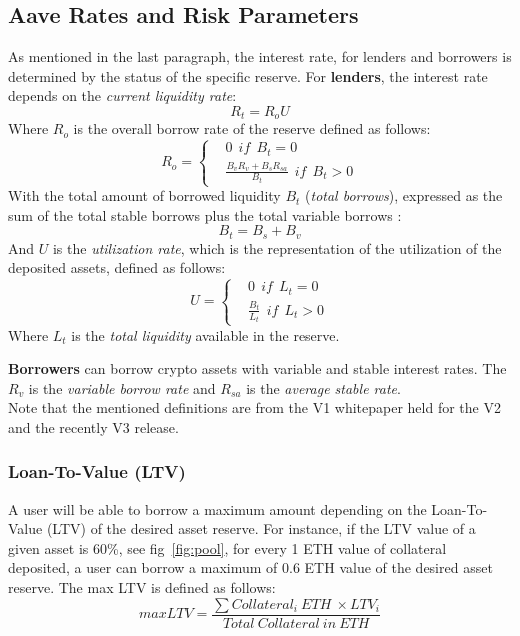\documentclass[11pt,a4paper]{report}
\begin{document}
\subsection{Aave Rates and Risk Parameters}\label{rates}
 As mentioned in the last paragraph, the interest rate, for lenders and borrowers is determined by the status of the specific reserve. For \textbf{lenders}, the interest rate depends on  the \textit{current liquidity rate}:
\[ R_{t} = R_{o}U \]
Where $ R_{o} $ is the overall borrow rate of the reserve defined as follows:
\begin{equation}
	R_{o} = 
	\left\{\begin{matrix}
		&  0~~if~~B_{t}=0\\ 
		& \frac{B_{v}R_{v}+ B_{s}R_{sa}}{B_{t}}~~if~~B_{t} > 0
	\end{matrix}\right.
\end{equation}
With the total amount of borrowed liquidity $B_{t} $ (\textit{total borrows}), expressed as the sum of the total stable borrows plus  the total variable borrows :
\[ B_{t} = B_{s}+B_{v} \]
And $ U $ is the \textit{utilization rate}, which is the representation of the utilization of the deposited assets, defined as follows:
\begin{equation}
	U = 
	\left\{\begin{matrix}
		&  0~~if~~L_{t}=0\\ 
		& \frac{B_{t}}{L_{t}}~~if~~L_{t} > 0
	\end{matrix}\right.
\end{equation}
Where $L_{t}$  is the \textit{total liquidity} available in the reserve.

\textbf{Borrowers} can borrow crypto assets with variable and stable interest rates. 
The $R_{v}$\cite{aaveV1RV} is the \textit{variable borrow rate} and $R_{sa}$\cite{aaveV1RS} is the \textit{average stable rate}. \\

Note that the mentioned definitions are from the V1\cite{aaveV1} whitepaper held for the V2\cite{aaveV2} and the recently V3\cite{aaveV3} release.

\subsubsection{Loan-To-Value (LTV)} 
A user will be able to borrow a maximum amount depending on the Loan-To-Value (LTV)\cite{aaveV1}\cite{risk} of the desired asset reserve. For instance, if the LTV value of a given asset is  60\%, see fig~\ref{fig:pool}, for every 1 ETH value of collateral deposited, a user can borrow a maximum of 0.6 ETH value of the desired asset reserve. The max LTV is defined as follows:\[ maxLTV = \frac{\sum Collateral_{i}~ETH~\times LTV_{i}}{Total~Collateral~in~ETH} \]
\end{document}

